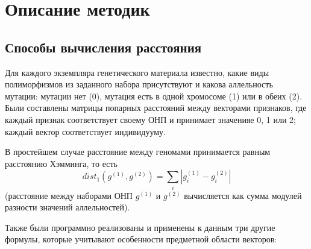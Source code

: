 \documentclass[main.tex]{subfiles}
\begin{document}
\section{Описание методик} \label{alg_desc}

\subsection{Способы вычисления расстояния}\label{section:metrics}

Для каждого экземпляра генетического материала известно, какие виды полиморфизмов из заданного набора присутствуют и какова аллельность мутации: мутации нет (0), мутация есть в одной хромосоме (1) или в обеих (2). Были составлены матрицы попарных расстояний между векторами признаков, где каждый признак соответствует своему ОНП и принимает значенияе 0, 1 или 2; каждый вектор соответствует индивидууму.

В простейшем случае расстояние между геномами принимается равным расстоянию Хэмминга, то есть
\begin{equation}\label{eq:hamming}
    dist_1(g^{(1)}, g^{(2)}) = \sum_{i} | g^{(1)}_i - g^{(2)}_i |
\end{equation}
(расстояние между наборами ОНП $g^{(1)}$ и $g^{(2)}$ вычисляется как сумма модулей разности значений аллельностей).

Также были программно реализованы и применены к данным три другие формулы, которые учитывают особенности предметной области векторов:
\end{document}
